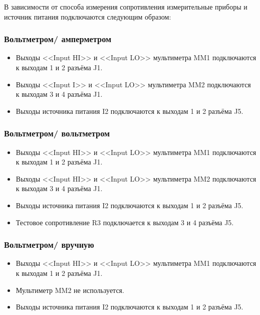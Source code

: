 В зависимости от способа измерения сопротивления измерительные приборы и источник питания подключаются следующим образом:

\subsubsection{Вольтметром/ амперметром}

    \begin{itemize}
        \item Выходы <<Input HI>> и <<Input LO>> мультиметра MM1 подключаются к выходам 1 и 2 разъёма J1. 
        \item Выходы <<Input I>> и <<Input LO>> мультиметра MM2 подключаются к выходам 3 и 4 разъёма J1. 
        \item Выходы источника питания I2 подключаются к выходам 1 и 2 разъёма J5. 
    \end{itemize}

\subsubsection{Вольтметром/ вольтметром}

    \begin{itemize}
        \item Выходы <<Input HI>> и <<Input LO>> мультиметра MM1 подключаются к выходам 1 и 2 разъёма J1. 
        \item Выходы <<Input HI>> и <<Input LO>> мультиметра MM2 подключаются к выходам 3 и 4 разъёма J1. 
        \item Выходы источника питания I2 подключаются к выходам 1 и 2 разъёма J5. 
        \item Тестовое сопротивление R3 подключается к выходам 3 и 4 разъёма J5. 
    \end{itemize}
        
\subsubsection{Вольтметром/ вручную}

    \begin{itemize}
        \item Выходы <<Input HI>> и <<Input LO>> мультиметра MM1 подключаются к выходам 1 и 2 разъёма J1. 
        \item Мультиметр MM2 не используется. 
        \item Выходы источника питания I2 подключаются к выходам 1 и 2 разъёма J5. 
    \end{itemize}
        
